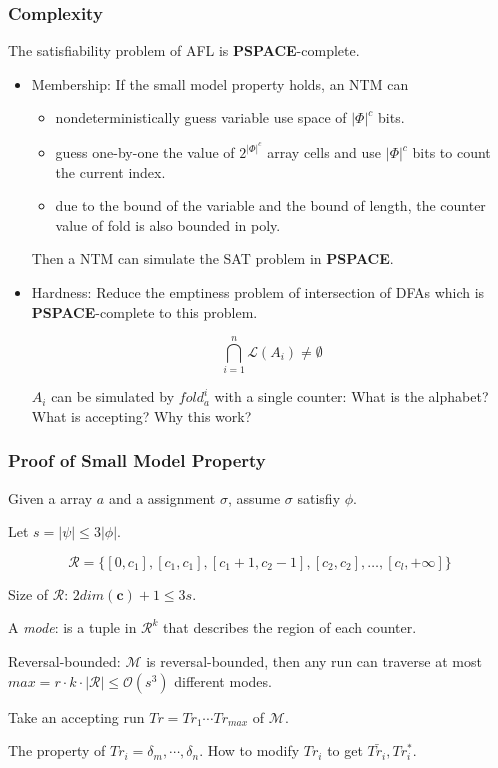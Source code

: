 \documentclass[11pt]{beamer}
\begin{document}
\begin{frame}\frametitle{Complexity}


\begin{theorem}
The satisfiability problem of AFL is \textbf{PSPACE}-complete.

\end{theorem}
\begin{itemize}
\item Membership:
If the small model property holds, an NTM can
\begin{itemize}
\item nondeterministically guess variable use space of $|\Phi|^c$ bits.
\item guess one-by-one the value of $2^{|\Phi|^c}$ array cells and use $|\Phi|^c$ bits to count the current index.
\item due to the bound of the variable and the bound of length, the counter value of fold is also bounded in poly.
\end{itemize} 

Then a NTM can simulate the SAT problem in \textbf{PSPACE}.








\item Hardness:
Reduce the emptiness problem of intersection of DFAs which is \textbf{PSPACE}-complete to this problem.

\[\bigcap_{i = 1}^n \mathcal{L}(A_i)\ne \emptyset\]


$A_i$ can be simulated by $fold^i_a$ with a single counter: What is the alphabet? What is accepting? Why this work?
\end{itemize}

\end{frame}



\begin{frame}\frametitle{Proof of Small Model Property}

Given a array $a$ and a assignment $\sigma$, assume $\sigma$ satisfiy $\phi$.

Let $s = |\psi| \le 3|\phi|$.


\[\mathcal{R} = \{[0, c_1], [c_1,c_1], [c_1 + 1, c_2 - 1], [c_2, c_2], \ldots, [c_l, +\infty]\}\]

Size of $\mathcal{R}$: $2dim(\mathbf{c}) + 1 \le 3s$.


A \textit{mode}: is a tuple in $\mathcal{R}^k$ that describes the region of each counter.

Reversal-bounded: $\mathcal{M}$ is reversal-bounded, then any run can traverse at most $max = r\cdot k \cdot |\mathcal{R}| \le \mathcal{O}(s^3)$ different modes.

Take an accepting run $Tr = Tr_1\cdots Tr_{max} $ of $\mathcal{M}$.

The property of $Tr_i = \delta_m, \cdots, \delta_n$. How to modify $Tr_i$ to get $\bar{Tr_i}, Tr_i^*$.




\end{frame}
\end{document}
